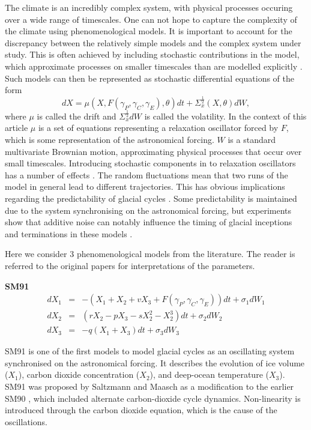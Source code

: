 \documentclass[a4paper,12pt]{article}
\begin{document}
The climate is an incredibly complex system, with physical processes occuring over a wide range of timescales.
One can not hope to capture the complexity of the climate using phenomenological models.
It is important to account for the discrepancy between the relatively simple models and the complex system under study.
This is often achieved by including stochastic contributions in the model, which approximate processes on smaller timescales than are modelled explicitly \cite{Hasselmann1976}.
Such models can then be represented as stochastic differential equations of the form
\[ dX = \mu (X,F(\gamma_P,\gamma_C,\gamma_E),\theta) dt + \Sigma^{\frac{1}{2}}_x (X,\theta) dW, \]
\noindent where $\mu$ is called the drift and $\Sigma^{\frac{1}{2}}_x dW$ is called the volatility.
In the context of this article $\mu$ is a set of equations representing a relaxation oscillator forced by $F$, which is some representation of the astronomical forcing.
$W$ is a standard multivariate Brownian motion, approximating physical processes that occur over small timescales.
Introducing stochastic components in to relaxation oscillators has a number of effects \cite{Lindner2004}.
The random fluctuations mean that two runs of the model in general lead to different trajectories.
This has obvious implications regarding the predictability of glacial cycles \cite{Crucifix2009,Crucifix2011}.
Some predictability is maintained due to the system synchronising on the astronomical forcing, but experiments show that additive noise can notably influence the timing of glacial inceptions and terminations in these models \cite{Crucifix2012}.

Here we consider 3 phenomenological models from the literature.
The reader is referred to the original papers for interpretations of the parameters.

\vspace{0.5cm}

{\bf SM91}
\begin{eqnarray*}
dX_1 & = & -\left( X_1 + X_2 + v X_3 + F(\gamma_P,\gamma_C,\gamma_E) \right)dt + \sigma_1 dW_1 \\
dX_2 & = & \left( r X_2 - p X_3 - s X_2^2 - X_2^3 \right)dt + \sigma_2 dW_2 \\
dX_3 & = & -q \left( X_1 + X_3 \right) dt + \sigma_3 dW_3
\end{eqnarray*}

SM91 \cite{Saltzman1991} is one of the first models to model glacial cycles as an oscillating system synchronised on the astronomical forcing.
It describes the evolution of ice volume ($X_1$), carbon dioxide concentration ($X_2$), and deep-ocean temperature ($X_3$).
SM91 was proposed by Saltzmann and Maasch as a modification to the earlier SM90 \cite{Saltzman1990}, which included alternate carbon-dioxide cycle dynamics.
Non-linearity is introduced through the carbon dioxide equation, which is the cause of the oscillations.
\end{document}
